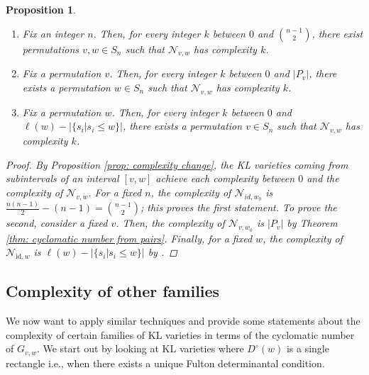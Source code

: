 \documentclass[11pt]{amsart}
\newtheorem{proposition}[theorem]{Proposition}
\theoremstyle{definition}
\theoremstyle{definition}
\theoremstyle{definition}
\theoremstyle{definition}
\newcommand{\Gvwt}{G_{v,w}}
\newcommand{\Nvw}{\mathcal{N}_{v,w}}
\newcommand{\Dc}{D^{\circ}}
\begin{document}
\begin{proposition}
\begin{enumerate}
    \item Fix an integer $n$. Then, for every integer $k$ between $0$ and ${{n-1} \choose 2}$, there exist permutations $v,w \in S_n$ such that $\Nvw$ has complexity $k$. 
    \item Fix a permutation $v$. Then, for every integer $k$ between $0$ and $|P_v|$, there exists a permutation $w \in S_n$ such that $\Nvw$ has complexity $k$. 
    \item Fix a permutation $w$. Then, for every integer $k$ between $0$ and $\ell(w) - |\{ s_i | s_i \leq w \} |$, there exists a permutation $v \in S_n$ such that $\Nvw$ has complexity $k$. 
\end{enumerate}
    \begin{proof}
        By Proposition \ref{prop: complexity change}, the KL varieties coming from subintervals of an interval $[v,w]$ achieve each complexity between $0$ and the complexity of $\Nvw$. For a fixed $n$, the complexity of $\mathcal N_{id, w_0}$ is $\frac{n(n-1)}{2} - (n-1)= {{n-1} \choose 2}$; this proves the first statement. To prove the second, consider a fixed $v$. Then, the complexity of $\mathcal N_{v,w_0}$ is $|P_v|$ by Theorem \ref{thm: cyclomatic number from pairs}. Finally, for a fixed $w$, the complexity of $\mathcal N_{\textrm{id},w}$ is $\ell(w) - |\{ s_i | s_i \leq w \} |$ by \cite[Theorem 5.8]{donten2021complexity}. 
    \end{proof}
\end{proposition}

\subsection{Complexity of other families}

\noindent We now want to apply similar techniques and provide some statements about the complexity of certain families of KL varieties in terms of the cyclomatic number of $\Gvwt$. We start out by looking at KL varieties where $\Dc(w)$ is a single rectangle i.e., when there exists a unique Fulton determinantal condition.
\end{document}
